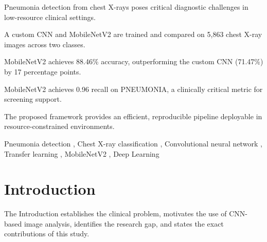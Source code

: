 \documentclass[preprint,12pt]{elsarticle}
\begin{document}
\begin{frontmatter}
\begin{abstract}
This work delivers a reproducible and computationally efficient CNN
pipeline suitable for pneumonia screening support in resource-constrained
clinical settings.
Grad-CAM and SHAP explainability analysis are identified as important
directions for future work.
\end{abstract}

\begin{highlights}
\item Pneumonia detection from chest X-rays poses critical diagnostic
      challenges in low-resource clinical settings.
\item A custom CNN and MobileNetV2 are trained and compared on 5{,}863
      chest X-ray images across two classes.
\item MobileNetV2 achieves 88.46\% accuracy, outperforming the custom
      CNN (71.47\%) by 17 percentage points.
\item MobileNetV2 achieves 0.96 recall on PNEUMONIA, a clinically
      critical metric for screening support.
\item The proposed framework provides an efficient, reproducible pipeline
      deployable in resource-constrained environments.
\end{highlights}

\begin{keyword}
Pneumonia detection \sep
Chest X-ray classification \sep
Convolutional neural network \sep
Transfer learning \sep
MobileNetV2 \sep
Deep Learning
\end{keyword}

\end{frontmatter}

\linenumbers

\section{Introduction}
The Introduction establishes the clinical problem, motivates the use of
CNN-based image analysis, identifies the research gap, and states the
exact contributions of this study.
\end{document}
